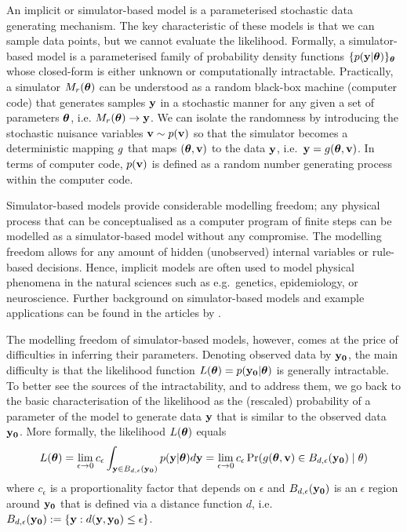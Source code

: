 An implicit or simulator-based model is a parameterised stochastic
data generating mechanism. The key characteristic of these models is
that we can sample data points, but we cannot evaluate the
likelihood. Formally, a simulator-based model is a parameterised
family of probability density functions
\(\{ p(\mathbf{y}|\boldsymbol{\theta}) \}_{\boldsymbol{\theta}}\) whose closed-form is either unknown
or computationally intractable. Practically, a simulator
\( M_r(\boldsymbol{\theta}) \) can be understood as a random black-box machine
(computer code) that generates samples \(\mathbf{y}\) in a stochastic manner
for any given a set of parameters \(\boldsymbol{\theta}\), i.e.
\( M_r(\boldsymbol{\theta}) \rightarrow \mathbf{y} \). We can isolate the randomness by
introducing the stochastic nuisance variables \(\mathbf{v} \sim p(\mathbf{v})\) so
that the simulator becomes a deterministic mapping \(g\) that
maps \((\boldsymbol{\theta}, \mathbf{v})\) to the data \(\mathbf{y}\), i.e.\
\(\mathbf{y}=g(\boldsymbol{\theta},\mathbf{v})\).  In terms of computer code,
\(p(\mathbf{v})\) is defined as a random number generating process within the
computer code.  %

Simulator-based models provide considerable modelling freedom; any
physical process that can be conceptualised as a computer program of
finite steps can be modelled as a simulator-based model without any
compromise. The modelling freedom allows for any amount of hidden
(unobserved) internal variables or rule-based decisions. Hence,
implicit models are often used to model physical phenomena in the
natural sciences such as e.g.~genetics, epidemiology, or neuroscience. 
Further background on simulator-based models and
example applications can be found in the articles
by \citet{Gutmann2016, Lintusaari2017, Sisson2018, Cranmer2020}.


The modelling freedom of simulator-based models, however, comes at the
price of difficulties in inferring their parameters. Denoting observed
data by \(\mathbf{y_0}\), the main difficulty is that the likelihood function
\(L(\boldsymbol{\theta}) = p(\mathbf{y_0}|\boldsymbol{\theta})\) is generally intractable. To better
see the sources of the intractability, and to address them, we go back
to the basic characterisation of the likelihood as the (rescaled)
probability of a parameter of the model to generate data \(\mathbf{y}\) that
is similar to the observed data \(\mathbf{y_0}\). More formally, the
likelihood \(L(\boldsymbol{\theta})\) equals
\begin{equation} \label{eq:likelihood}
  L(\boldsymbol{\theta}) = \lim_{\epsilon \to 0} c_\epsilon \int_{\mathbf{y} \in B_{d,\epsilon}(\mathbf{y_0})} p(\mathbf{y}|\boldsymbol{\theta})d\mathbf{y} =
  \lim_{\epsilon \to 0} c_\epsilon \Pr(g(\boldsymbol{\theta}, \mathbf{v}) \in B_{d,\epsilon}(\mathbf{y_0})  \mid \theta)
\end{equation}
where \(c_\epsilon\) is a proportionality factor that depends on
\(\epsilon\) and \(B_{d,\epsilon}(\mathbf{y_0})\) is an \(\epsilon\) region around \(\mathbf{y_0}\)
that is defined via a distance function \(d\), i.e.\ \(B_{d,\epsilon}(\mathbf{y_0})
:= \{\mathbf{y}: d(\mathbf{y}, \mathbf{y_0}) \leq \epsilon \}\). 

